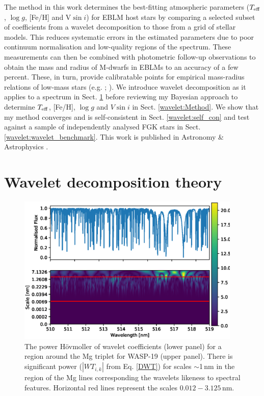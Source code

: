 The method in this work determines the best-fitting atmospheric parameters ($T_{\rm eff}$, $\log g$, [Fe/H] and V$\sin i$) for EBLM host stars by comparing a selected subset of coefficients from a wavelet decomposition to those from a grid of stellar models. This reduces systematic errors in the estimated parameters due to poor continuum normalisation and low-quality regions of the spectrum. These measurements can then be combined with photometric follow-up observations to obtain the mass and radius of M-dwarfs in EBLMs to an accuracy of a few percent. These, in turn, provide calibratable points for empirical mass-radius relations of low-mass stars (e.g. \citealt{2009A&A...505..205D}; \citealt{2010A&ARv..18...67T}). We introduce wavelet decomposition as it applies to a spectrum in Sect. \ref{wavelet:wavelet_decomposition} before reviewing my Bayesian approach to determine $T_{\rm eff}$, [Fe/H], $\log g$ and $V \sin i$ in Sect. \ref{wavelet:Method}. We show that my method converges and is self-consistent in Sect. \ref{wavelet:self_con} and test against a sample of independently analysed FGK stars in Sect. \ref{wavelet:wavelet_benchmark}. This work is published in Astronomy \& Astrophysics \citep{2018A&A...612A.111G}.  


\section{Wavelet decomposition theory}\label{wavelet:wavelet_decomposition}

\begin{figure}[ht!]
\centering
\includegraphics[width=0.95\textwidth]{5-images/wavelet_power.eps}
\caption{The power H\"{o}vmoller of wavelet coefficients (lower panel) for a region around the Mg triplet for WASP-19 (upper panel). There is significant power ($|WT_{i,k}|$ from Eq. \ref{DWT}) for scales $\sim$1\,nm in the region of the Mg lines corresponding the wavelets likeness to spectral features. Horizontal red lines represent the scales $0.012-3.125$\,nm.}
\label{fig:wavelet:wavelet_power}
\end{figure}



